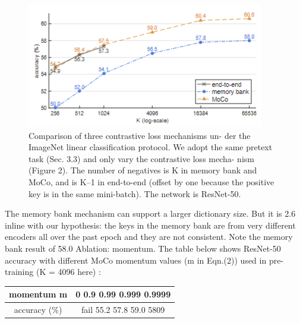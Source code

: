 \documentclass[10pt,twocolumn]{article}  %
\begin{document}
\begin{figure}[htbp]
    \centering
    \includegraphics[width=0.8\linewidth]{Pic/figure3.png} %
    \caption{ Comparison of three contrastive loss mechanisms un-
    der the ImageNet linear classiﬁcation protocol. We adopt the same
    pretext task (Sec. 3.3) and only vary the contrastive loss mecha-
    nism (Figure 2). The number of negatives is K in memory bank
    and MoCo, and is K--1 in end-to-end (offset by one because the
    positive key is in the same mini-batch). The network is ResNet-50.} %
    \label{fig:Figure 3} %
\end{figure}

The memory bank \cite{61_wu2018unsupervised} mechanism can support a larger
dictionary size. But it is 2.6%
inline with our hypothesis: the keys in the memory bank
are from very different encoders all over the past epoch and
they are not consistent. Note the memory bank result of
58.0%
Ablation: momentum. The table below shows ResNet-50
accuracy with different MoCo momentum values (m in
Eqn.(2)) used in pre-training (K = 4096 here) :

\begin{table}[htbp]
    \centering
    \begin{tabular}{c|c} %
        momentum m & 0 0.9 0.99 0.999 0.9999 \\ 
        \hline %
        accuracy (\%) & fail 55.2 57.8 59.0 5809 \\ 
    \end{tabular}
    \label{tab:tab} %
\end{table}
\end{document}
